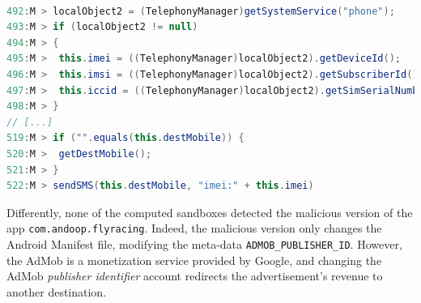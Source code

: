 \begin{lstlisting}[caption={Diffs in the malicious version
      of the class \texttt{com.android.main.MainService}
      (app \texttt{com.gau.screenguru.finger})},
      language=Java, basicstyle=\fontsize{8}{6}\selectfont\ttfamily,
      label={lst:mainService}]

492:M > localObject2 = (TelephonyManager)getSystemService("phone");
493:M > if (localObject2 != null)
494:M > {
495:M >  this.imei = ((TelephonyManager)localObject2).getDeviceId();
496:M >  this.imsi = ((TelephonyManager)localObject2).getSubscriberId();
497:M >  this.iccid = ((TelephonyManager)localObject2).getSimSerialNumber();
498:M > }
// [...]
519:M > if ("".equals(this.destMobile)) {
520:M >  getDestMobile();
521:M > }
522:M > sendSMS(this.destMobile, "imei:" + this.imei)
\end{lstlisting}





Differently, none of the computed sandboxes detected the malicious version
of the app \texttt{com.andoop.flyracing}. Indeed,
the malicious version {\color{red}only} changes the
Android Manifest file, modifying the meta-data \texttt{ADMOB\_PUBLISHER\_ID}.
However, the AdMob is a monetization service provided by Google, and changing the
AdMob \emph{publisher identifier} account redirects the advertisement's
revenue to another destination. 

